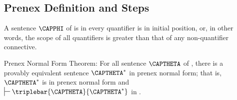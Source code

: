 \subsection{Prenex Definition and Steps}\label{Prenex Definition and Steps}
\begin{majorILnc}{}
A sentence $\CAPPHI$ of \GQL{} is in  \Iff every quantifier is in initial position, or, in other words, the scope of all quantifiers is greater than that of any non-quantifier connective.
\end{majorILnc}
\begin{THEOREM}{ Prenex Normal Form Theorem:}
For all sentence $\CAPTHETA$ of \GQL{}, there is a provably equivalent sentence $\CAPTHETA^*$ in prenex normal form; that is, $\CAPTHETA^*$ is in prenex normal form and $\sststile{}{}\triplebar{\CAPTHETA}{\CAPTHETA^*}$ in \GQD{}.
\end{THEOREM}
